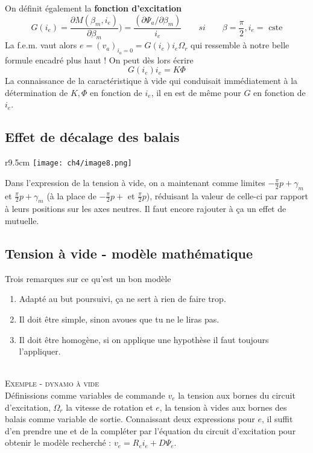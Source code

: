 		On définit également la \textbf{fonction d'excitation}
		\begin{equation}
		G(i_e) = \frac{\partial M(\beta_m,i_e)}{\partial \beta_m}) =
		\frac{(\partial \Psi_a/\partial \beta_m)}{i_e}\qquad si\qquad 
		\beta=\frac{\pi}{2}, i_e=\text{ cste}
		\end{equation}
		La f.e.m. vaut alors $e = (v_a)_{i_a=0} = G(i_e)i_e\Omega_r$ 
		qui ressemble à notre belle formule encadré plus haut ! On 
		peut dès lors écrire
		\begin{equation}
		G(i_e)i_e = K\Phi
		\end{equation}
		La connaissance de la caractéristique à vide qui conduisait 
		immédiatement à la détermination de $K, \Phi$ en fonction de 
		$i_e$, il en est de même pour $G$ en fonction de $i_e$.
		
	\subsection{Effet de décalage des balais}
	\begin{wrapfigure}[7]{r}{9.5cm}
	\vspace{-8mm}
	\texttt{[image: ch4/image8.png]}
	\end{wrapfigure}
	Dans l'expression de la tension à vide, on a maintenant comme 
	limites $-\frac{\pi}{2}p+\gamma_m$ et $\frac{\pi}{2}p+\gamma_m$ (à 
	la place de $-\frac{\pi}{2}p+$ et $\frac{\pi}{2}p$), réduisant la 
	valeur de celle-ci par rapport à leurs positions sur les axes neutres. 
	Il faut encore rajouter à ça un effet de mutuelle.
	
	\subsection{Tension à vide - modèle mathématique}
	Trois remarques sur ce qu'est un bon modèle
	\begin{enumerate}
	\item Adapté au but poursuivi, ça ne sert à rien de faire trop.
	\item Il doit être simple, sinon avoues que tu ne le liras pas.
	\item Il doit être homogène, si on applique une hypothèse il faut 
	toujours l'appliquer.
	\end{enumerate}\ \\
	
	\textsc{Exemple - dynamo à vide}\\
	Définissions comme variables de commande $v_e$ la tension aux bornes 
	du circuit d'excitation, $\Omega_r$ la vitesse de rotation et $e$, 
	la tension à vides aux bornes des balais comme variable de sortie. 
	Connaissant deux expressions pour $e$, il suffit d'en prendre une et 
	de la compléter par l'équation du circuit d'excitation pour obtenir le 
	modèle recherché : $v_e = R_ei_e +D\Psi_e$.
	
